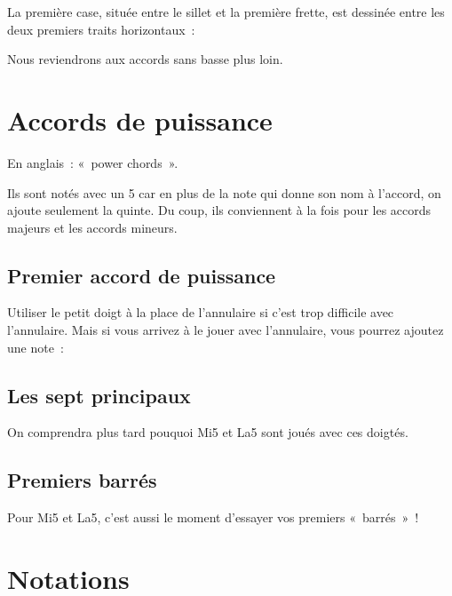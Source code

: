 \documentclass[11pt]{article}
\begin{document}
La première case, située entre le sillet et la première frette, est
dessinée entre les deux premiers traits horizontaux~:


Nous reviendrons aux accords sans basse plus loin.

\section{Accords de puissance}

En anglais~: «~power chords~».

Ils sont notés avec un 5 car en plus de la note qui donne son nom à l’accord,
on ajoute seulement la quinte. Du coup, ils conviennent à la fois pour les
accords majeurs et les accords mineurs.

\subsection{Premier accord de puissance}


Utiliser le petit doigt à la place de l’annulaire si c’est trop difficile avec
l’annulaire. Mais si vous arrivez à le jouer avec l’annulaire, vous pourrez
ajoutez une note~:


\subsection{Les sept principaux}


On comprendra plus tard pouquoi Mi5 et La5 sont joués avec ces doigtés.

\subsection{Premiers barrés}

Pour Mi5 et La5, c’est aussi le moment d’essayer vos premiers «~barrés~»~!


\section{Notations}
\end{document}

